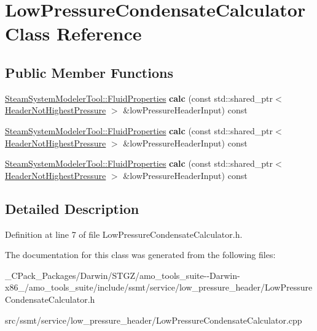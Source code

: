 \hypertarget{class_low_pressure_condensate_calculator}{}\section{Low\+Pressure\+Condensate\+Calculator Class Reference}
\label{class_low_pressure_condensate_calculator}
\subsection*{Public Member Functions}
\begin{DoxyCompactItemize}
\item 
\mbox{\label{class_low_pressure_condensate_calculator_a26442f2f3badf66641a2c17ea40925d2}} 
\hyperlink{struct_steam_system_modeler_tool_1_1_fluid_properties}{Steam\+System\+Modeler\+Tool\+::\+Fluid\+Properties} {\bfseries calc} (const std\+::shared\+\_\+ptr$<$ \hyperlink{class_header_not_highest_pressure}{Header\+Not\+Highest\+Pressure} $>$ \&low\+Pressure\+Header\+Input) const
\item 
\mbox{\label{class_low_pressure_condensate_calculator_a26442f2f3badf66641a2c17ea40925d2}} 
\hyperlink{struct_steam_system_modeler_tool_1_1_fluid_properties}{Steam\+System\+Modeler\+Tool\+::\+Fluid\+Properties} {\bfseries calc} (const std\+::shared\+\_\+ptr$<$ \hyperlink{class_header_not_highest_pressure}{Header\+Not\+Highest\+Pressure} $>$ \&low\+Pressure\+Header\+Input) const
\item 
\mbox{\label{class_low_pressure_condensate_calculator_a26442f2f3badf66641a2c17ea40925d2}} 
\hyperlink{struct_steam_system_modeler_tool_1_1_fluid_properties}{Steam\+System\+Modeler\+Tool\+::\+Fluid\+Properties} {\bfseries calc} (const std\+::shared\+\_\+ptr$<$ \hyperlink{class_header_not_highest_pressure}{Header\+Not\+Highest\+Pressure} $>$ \&low\+Pressure\+Header\+Input) const
\end{DoxyCompactItemize}


\subsection{Detailed Description}


Definition at line 7 of file Low\+Pressure\+Condensate\+Calculator.\+h.



The documentation for this class was generated from the following files\+:\begin{DoxyCompactItemize}
\item 
\+\_\+\+C\+Pack\+\_\+\+Packages/\+Darwin/\+S\+T\+G\+Z/amo\+\_\+tools\+\_\+suite-\/-\/\+Darwin-\/x86\+\_/amo\+\_\+tools\+\_\+suite/include/ssmt/service/low\+\_\+pressure\+\_\+header/Low\+Pressure\+Condensate\+Calculator.\+h\item 
src/ssmt/service/low\+\_\+pressure\+\_\+header/Low\+Pressure\+Condensate\+Calculator.\+cpp\end{DoxyCompactItemize}
